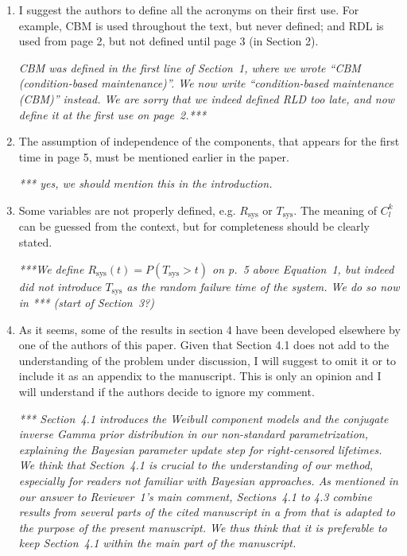 \documentclass[authoryear]{elsarticle}
\newcommand{\Tsys}{T_\text{sys}}
\newcommand{\Rsys}{R_\text{sys}}
\begin{document}
\begin{enumerate}
\item I suggest the authors to define all the acronyms on their first use. For example, CBM is used throughout the text, but never defined; and RDL is used from page 2, but not defined until page 3 (in Section 2).

\smallskip

\emph{CBM was defined in the first line of Section~1, where we wrote ``CBM (condition-based maintenance)''.
We now write ``condition-based maintenance (CBM)'' instead.
We are sorry that we indeed defined RLD too late, and now define it at the first use on page~2.***}

\item The assumption of independence of the components, that appears for the first time in page 5, must be mentioned earlier in the paper.

\smallskip

\emph{*** yes, we should mention this in the introduction.}

\item Some variables are not properly defined, e.g. $\Rsys$ or $\Tsys$. The meaning of $C^k_l$ can be guessed from the context, but for completeness should be clearly stated.

\smallskip

\emph{***We define $\Rsys(t) = P(\Tsys > t)$ on p.~5 above Equation~1,
but indeed did not introduce $\Tsys$ as the random failure time of the system.
We do so now in *** (start of Section~3?)}

\item As it seems, some of the results in section 4 have been developed elsewhere by one of the authors of this paper. Given that Section 4.1 does not add to the understanding of the problem under discussion, I will suggest to omit it or to include it as an appendix to the manuscript. This is only an opinion and I will understand if the authors decide to ignore my comment.

\smallskip

\emph{*** Section~4.1 introduces the Weibull component models
and the conjugate inverse Gamma prior distribution in our non-standard parametrization,
explaining the Bayesian parameter update step for right-censored lifetimes.
We think that Section~4.1 is crucial to the understanding of our method,
especially for readers not familiar with Bayesian approaches.
As mentioned in our answer to Reviewer~1's main comment,
Sections~4.1 to 4.3 combine results from several parts of the cited manuscript
in a from that is adapted to the purpose of the present manuscript.
We thus think that it is preferable to keep Section~4.1 within the main part of the manuscript.}


\end{enumerate}
\end{document}
